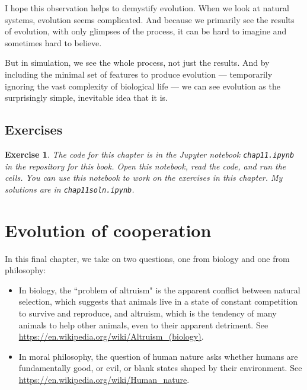 \documentclass[12pt]{book}
\theoremstyle{exercise}
\newtheorem{exercise}{Exercise}[chapter]
\begin{document}
I hope this observation helps to demystify evolution.  When we look at natural systems, evolution seems complicated.  And because we primarily see the results of evolution, with only glimpses of the process, it can be hard to imagine and sometimes hard to believe.

But in simulation, we see the whole process, not just the results.  And by including the minimal set of features to produce evolution --- temporarily ignoring the vast complexity of biological life --- we can see evolution as the surprisingly simple, inevitable idea that it is.


\section{Exercises}

\begin{exercise}

The code for this chapter is in the Jupyter notebook {\tt chap11.ipynb}
in the repository for this book.  Open this notebook, read the code,
and run the cells.  You can use this notebook to work on the
exercises in this chapter.  My solutions are in {\tt chap11soln.ipynb}.

\end{exercise}


\chapter{Evolution of cooperation}

In this final chapter, we take on two questions, one from biology and one from philosophy:

\begin{itemize}

\item In biology, the ``problem of altruism" is the apparent conflict between natural selection, which suggests that animals live in a state of constant competition to survive and reproduce, and altruism, which is the tendency of many animals to help other animals, even to their apparent detriment.  See \url{https://en.wikipedia.org/wiki/Altruism_(biology)}.

\item In moral philosophy, the question of human nature asks whether humans are fundamentally good, or evil, or blank states shaped by their environment.  See \url{https://en.wikipedia.org/wiki/Human_nature}.

\end{itemize}
\end{document}
